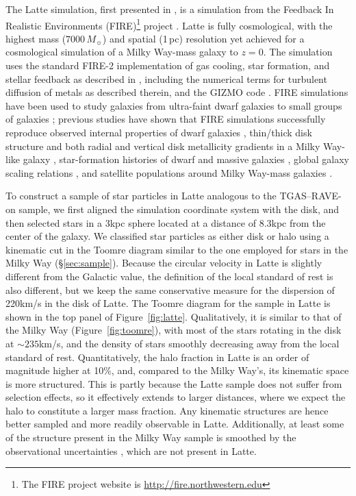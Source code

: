 \documentclass[apj, twocolappendix, numberedappendix, appendixfloats]{emulateapj}
\begin{document}
The Latte simulation, first presented in \citet{wetzel2016}, is a simulation from the Feedback In Realistic Environments (FIRE)\footnote{The FIRE project website is \url{http://fire.northwestern.edu}} project \citep{hopkins2014FIRE}. Latte is fully cosmological, with the highest mass ($7000 \,M_{\sun}$) and spatial (1\,pc) resolution yet achieved for a cosmological simulation of a Milky Way-mass galaxy to $z = 0$. The simulation uses the standard FIRE-2 implementation of gas cooling, star formation, and stellar feedback as described in \citet{hopkins2017}, including the numerical terms for turbulent diffusion of metals as described therein, and the GIZMO code \citep{hopkins2015}. FIRE simulations have been used to study galaxies from ultra-faint dwarf galaxies \citep{wheeler2015} to small groups of galaxies \citep{feldmann2016}; previous studies have shown that FIRE simulations successfully reproduce observed internal properties of dwarf galaxies \citep{chan:fire.dwarf.cusps, elbadry2016}, thin/thick disk structure and both radial and vertical disk metallicity gradients in a Milky Way-like galaxy \citep{ma2016}, star-formation histories of dwarf and massive galaxies \citep{hopkins2014, sparre:sfmainsequence}, global galaxy scaling relations \citep{hopkins2014, ma:mass.metallicity, feldmann2016}, and satellite populations around Milky Way-mass galaxies \citep{wetzel2016}.

To construct a sample of star particles in Latte analogous to the TGAS--RAVE-on sample, we first aligned the simulation coordinate system with the disk, and then selected stars in a 3\;kpc sphere located at a distance of 8.3\;kpc from the center of the galaxy.
We classified star particles as either disk or halo using a kinematic cut in the Toomre diagram similar to the one employed for stars in the Milky Way (\S\ref{sec:sample}).
Because the circular velocity in Latte is slightly different from the Galactic value, the definition of the local standard of rest is also different, but we keep the same conservative measure for the dispersion of 220\;km/s in the disk of Latte.
The Toomre diagram for the sample in Latte is shown in the top panel of Figure~\ref{fig:latte}.
Qualitatively, it is similar to that of the Milky Way (Figure~\ref{fig:toomre}), with most of the stars rotating in the disk at $\sim235$\;km/s, and the density of stars smoothly decreasing away from the local standard of rest.
Quantitatively, the halo fraction in Latte is an order of magnitude higher at 10\%, and, compared to the Milky Way's, its kinematic space is more structured.
This is partly because the Latte sample does not suffer from selection effects, so it effectively extends to larger distances, where we expect the halo to constitute a larger mass fraction.
Any kinematic structures are hence better sampled and more readily observable in Latte.
Additionally, at least some of the structure present in the Milky Way sample is smoothed by the observational uncertainties \citep[see, e.g.,][]{sanderson2015}, which are not present in Latte.
\end{document}
